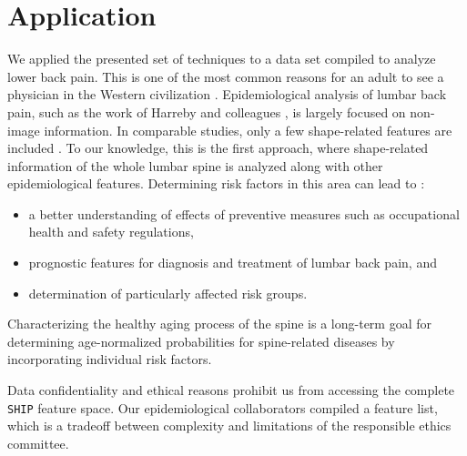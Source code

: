 \documentclass[journal]{style/vgtc} 			          %
\begin{document}
\section{Application}
We applied the presented set of techniques to a data set compiled to analyze lower back pain. 
%
This is one of the most common reasons for an adult to see a physician in the Western civilization \cite{Backpain}.
%
Epidemiological analysis of lumbar back pain, such as the work of Harreby and colleagues \cite{Harreby1996}, is largely focused on non-image information.
%
In comparable studies, only a few shape-related features are included \cite{Lang2011}.
%
To our knowledge, this is the first approach, where shape-related information of the whole lumbar spine is analyzed along with other epidemiological features.
%
Determining risk factors in this area can lead to \cite{Fletcher2012}:
\begin{itemize}
	\item a better understanding of effects of preventive measures such as occupational health and safety regulations,
	\item prognostic features for diagnosis and treatment of lumbar back pain, and
	\item determination of particularly affected risk groups.
\end{itemize}
%
Characterizing the healthy aging process of the spine is a long-term goal for determining age-normalized probabilities for spine-related diseases by incorporating individual risk factors.

Data confidentiality and ethical reasons prohibit us from accessing the complete \texttt{SHIP} feature space.
%
Our epidemiological collaborators compiled a feature list, which is a tradeoff between complexity and limitations of the responsible ethics committee.
%
%
\end{document}
